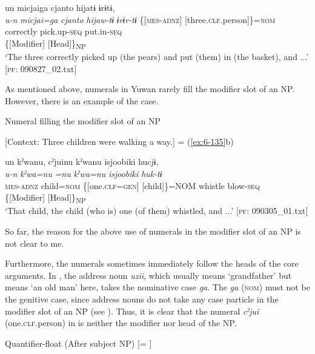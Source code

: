 \ex \label{ex:7:14b}
{\TM}
\glll un  micjaiga  {\textbar}cjanto{\textbar}  hijatɨ  ɨrɨtɨ,\\
      \textit{u-n}  \textit{micjai=ga}  \textit{cjanto}  \textit{hijaw-tɨ}      \textit{ɨrɨr-tɨ}
      \{[\textsc{mes}-\textsc{adnz}]  [three.\textsc{clf}.person]\}=\textsc{nom}  correctly  pick.up-\textsc{seq}            put.in-\textsc{seq}\\
      \{[Modifier]  [Head]\}\textsubscript{NP}    \\
\glt    ‘The three correctly picked up (the pears) and put (them) in (the basket), and ...’     [\textsc{pf}: 090827\_02.txt]

    \z
\z

As mentioned above, numerals in Yuwan rarely fill the modifier slot of an NP. However, there is an example of the case.

\ea \label{ex:7:15}  Numeral filling the modifier slot of an NP

  [Context: Three children were walking a way.] = (\ref{ex:6-135}b)

{\TM}
\gllll  un  kˀwanu,  cˀjuinu  kˀwanu  isjoobiki   hucjɨ,\\
\textit{u-n}  \textit{kˀwa=nu}  \textit{=nu}  \textit{kˀwa=nu}  \textit{isjoobiki} \textit{huk-tɨ}\\
\textsc{mes}-\textsc{adnz}  child=\textsc{nom}  \{[one.\textsc{clf}=\textsc{gen}]  [child]\}=NOM  whistle   blow-\textsc{seq}\\
\{[Modifier]  [Head]\}\textsubscript{NP}      \\
\glt ‘That child, the child (who is) one (of them) whistled, and ...’ [\textsc{pf}: 090305\_01.txt]

\z

So far, the reason for the above use of numerals in the modifier slot of an NP is not clear to me.

Furthermore, the numerals sometimes immediately follow the heads of the core arguments. In , the address noun \textit{uzii}, which usually means ‘grandfather’ but means ‘an old man’ here, takes the nominative case \textit{ga}. The \textit{ga} (\textsc{nom}) must not be the genitive case, since address nouns do not take any case particle in the modifier slot of an NP (see ). Thus, it is clear that the numeral \textit{cˀjui} (one.\textsc{clf}.person) in  is neither the modifier nor head of the NP.

\ea \label{ex:7:16}  Quantifier-float (After subject NP) [= ]

